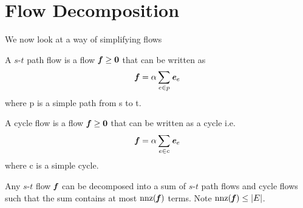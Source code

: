 \section{Flow Decomposition}
We now look at a way of simplifying flows
\begin{definition}
  A $s$-$t$ path flow is a flow \(\boldsymbol{\mathit{f}} \geq \boldsymbol{0}\) that can be written as
  \begin{equation}\nonumber
      \boldsymbol{\mathit{f}} = \alpha \sum_{e \in p} \boldsymbol{\mathit{e}}_e
  \end{equation}
  where p is a simple path from s to t.
\end{definition}
\begin{definition}
  A cycle flow is a flow \(\boldsymbol{\mathit{f}} \geq \boldsymbol{0} \) that can be written as a cycle i.e.
  \begin{equation}\nonumber
      \boldsymbol{\mathit{f}} = \alpha \sum_{e \in c} \boldsymbol{\mathit{e}}_e
  \end{equation}
  where c is a simple cycle.
\end{definition}
\begin{lemma}
 Any $s$-$t$ flow \(\boldsymbol{\mathit{f}}\) can be decomposed into a sum of $s$-$t$ path
 flows and cycle flows such that the sum contains at most
 \(\operatorname{nnz}(\boldsymbol{\mathit{f}})\) terms. Note $\operatorname{nnz}(\boldsymbol{\mathit{f}}) \leq \left|E \right|$.
\end{lemma}
